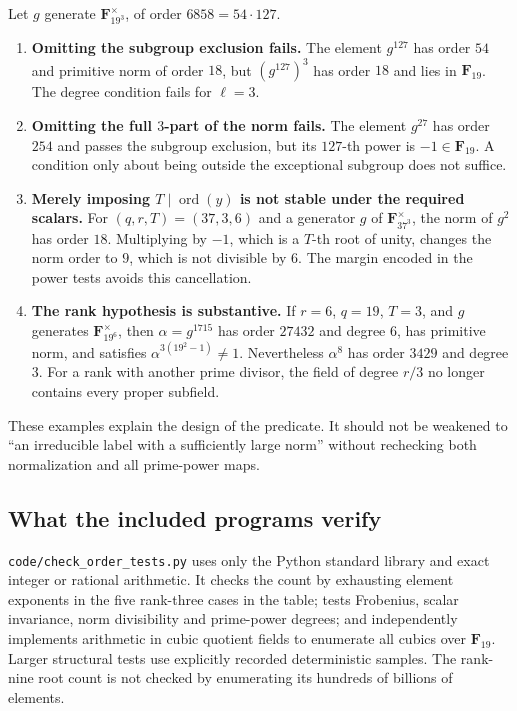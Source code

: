 \documentclass[11pt,a4paper]{article}
\newcommand{\F}{\mathbf F}
\newcommand{\ord}{\operatorname{ord}}
\newcommand{\src}[1]{\nolinkurl{#1}}
\theoremstyle{definition}
\theoremstyle{remark}
\begin{document}
Let $g$ generate $\F_{19^3}^{\times}$, of order $6858=54\cdot127$.
\begin{enumerate}
\item \textbf{Omitting the subgroup exclusion fails.} The element
$g^{127}$ has order $54$ and primitive norm of order $18$, but
$(g^{127})^3$ has order $18$ and lies in $\F_{19}$. The degree condition
fails for $\ell=3$.
\item \textbf{Omitting the full $3$-part of the norm fails.} The element
$g^{27}$ has order $254$ and passes the subgroup exclusion, but its
$127$-th power is $-1\in\F_{19}$. A condition only about being outside
the exceptional subgroup does not suffice.
\item \textbf{Merely imposing $T\mid\ord(y)$ is not stable under the
required scalars.} For $(q,r,T)=(37,3,6)$ and a generator $g$ of
$\F_{37^3}^{\times}$, the norm of $g^2$ has order $18$. Multiplying by
$-1$, which is a $T$-th root of unity, changes the norm order to $9$,
which is not divisible by $6$. The margin encoded in the power tests
avoids this cancellation.
\item \textbf{The rank hypothesis is substantive.} If $r=6$, $q=19$,
$T=3$, and $g$ generates $\F_{19^6}^{\times}$, then $\alpha=g^{1715}$
has order $27432$ and degree $6$, has primitive norm, and satisfies
$\alpha^{3(19^2-1)}\ne1$. Nevertheless $\alpha^8$ has order $3429$
and degree $3$. For a rank with another prime divisor, the field of
degree $r/3$ no longer contains every proper subfield.
\end{enumerate}

These examples explain the design of the predicate. It should not be
weakened to ``an irreducible label with a sufficiently large norm'' without
rechecking both normalization and all prime-power maps.

\subsection{What the included programs verify}

\src{code/check_order_tests.py} uses only the Python standard library
and exact integer or rational arithmetic. It checks the count by
exhausting element exponents in the five rank-three cases in the table;
tests Frobenius, scalar invariance, norm divisibility and prime-power
degrees; and independently implements arithmetic in cubic quotient
fields to enumerate all cubics over $\F_{19}$. Larger structural tests
use explicitly recorded deterministic samples. The rank-nine root count
is not checked by enumerating its hundreds of billions of elements.
\end{document}
